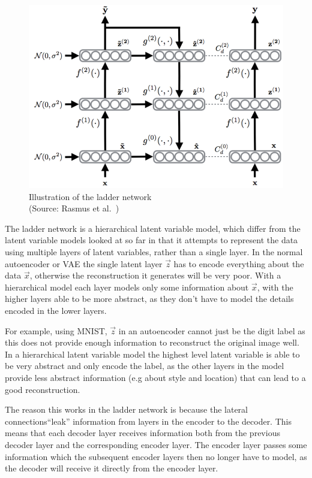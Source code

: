 \begin{figure}[H]
  \centering
  \includegraphics[scale=0.4]{figs/ladder.png}
  \caption[Illustration of the ladder network]{Illustration of the ladder network \\ (Source: Rasmus et al.~\cite{DBLP:journals/corr/RasmusVHBR15})}
  \label{fig:ladder}
\end{figure}

The ladder network is a hierarchical latent variable model, which differ from the latent variable models
looked at so far in that it attempts to represent the data using multiple layers of latent variables, rather than a 
single layer. 
In the normal autoencoder or VAE the single latent layer $\vec{z}$ has to encode everything about the data $\vec{x}$, otherwise the reconstruction it generates 
will be very poor. With a hierarchical model each layer models only some information about $\vec{x}$, with the higher layers able to be 
more abstract, 
as they don't have to model the details encoded in the lower layers. 

For example, using MNIST, $\vec{z}$ in an
autoencoder cannot just be the digit label as this does not provide enough information to reconstruct the original image well. 
In a hierarchical latent variable model the highest
level latent variable is able to be very abstract and only encode the label, as the other layers in the model provide less abstract 
information (e.g about style and location) that can lead to a good reconstruction.

The reason this works in the ladder network is because the lateral connections``leak'' information from layers in the encoder to the decoder. 
This means that each decoder layer
receives information both from the previous decoder layer and the corresponding encoder layer. The encoder layer passes some information which
the subsequent encoder layers then no longer have to model, as the decoder will receive it directly from the encoder layer.


